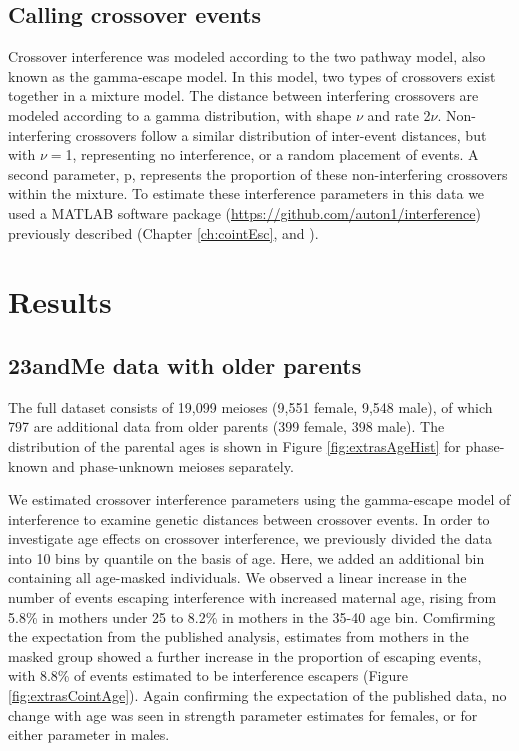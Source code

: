 \subsection{Calling crossover events}
Crossover interference was modeled according to the two pathway model, also known as the gamma-escape model.
In this model, two types of crossovers exist together in a mixture model.
The distance between interfering crossovers are modeled according to a gamma distribution, with shape $\nu$ and rate 2$\nu$.
Non-interfering crossovers follow a similar distribution of inter-event distances, but with $\nu=$1, representing no interference, or a random placement of events.
A second parameter, p, represents the proportion of these non-interfering crossovers within the mixture.
To estimate these interference parameters in this data we used a MATLAB software package (\url{https://github.com/auton1/interference}) previously described (Chapter \ref{ch:cointEsc}, and \citet{Campbell2015}).


\section{Results}
\subsection{23andMe data with older parents}

The full dataset consists of 19,099 meioses (9,551 female, 9,548 male), of which 797 are additional data from older parents (399 female, 398 male).
The distribution of the parental ages is shown in Figure \ref{fig:extrasAgeHist} for phase-known and phase-unknown meioses separately.

We estimated crossover interference parameters using the gamma-escape model of interference\cite{Housworth2003} to examine genetic distances between crossover events.
In order to investigate age effects on crossover interference, we previously divided the data into 10 bins by quantile on the basis of age.
Here, we added an additional bin containing all age-masked individuals.
We observed a linear increase in the number of events escaping interference with increased maternal age, rising from 5.8\% in mothers under 25 to 8.2\% in mothers in the 35-40 age bin.
Comfirming the expectation from the published analysis, estimates from mothers in the masked group showed a further increase in the proportion of escaping events, with 8.8\% of events estimated to be interference escapers (Figure \ref{fig:extrasCointAge}).
Again confirming the expectation of the published data, no change with age was seen in strength parameter estimates for females, or for either parameter in males.


